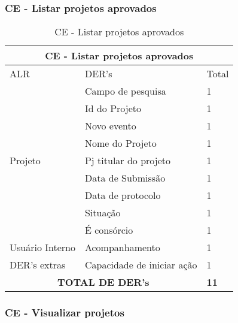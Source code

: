  \subsubsection{CE - Listar projetos aprovados}
\begin{table}[!h]
\centering
\caption{CE - Listar projetos aprovados}
\label{ce_listar_projetos_aprovados}
\begin{tabular}{|l|l|l|}
\multicolumn{3}{c}{CE - Listar projetos aprovados}                   \\\hline
ALR                      & DER's                      & Total         \\\hline
\multirow{9}{*}{Projeto} & Campo de pesquisa          & 1             \\ \cline{2-3}
                         & Id do Projeto                         & 1             \\ \cline{2-3}
                         & Novo evento                & 1             \\\cline{2-3}
                         & Nome do Projeto                    & 1             \\\cline{2-3}
                         & Pj titular do projeto      & 1             \\\cline{2-3}
                         & Data de Submissão          & 1             \\\cline{2-3}
                         & Data de protocolo          & 1             \\\cline{2-3}
                         & Situação                   & 1             \\\cline{2-3}
                         & É consórcio                & 1             \\\hline
Usuário Interno          & Acompanhamento             & 1             \\\hline
DER's extras             & Capacidade de iniciar ação & 1             \\\hline
\multicolumn{2}{|c|}{\textbf{TOTAL DE DER's}}                   & \textbf{11}  \\ \hline
\end{tabular}
\end{table}

   \vfill
      \pagebreak
  \subsubsection{CE - Visualizar projetos}
  
